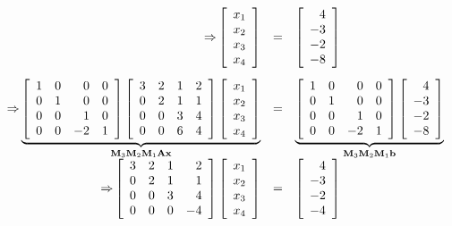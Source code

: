 \[\begin{array}{rcl} {\Rightarrow}
\left[\begin{array}{r}x_1\\x_2\\x_3\\x_4\end{array}\right]
&=&
\left[\begin{array}{r}4\\-3\\-2\\-8\end{array}\right] \;\;\;\\ \vspace*{-1mm} \\
{\Rightarrow} \underbrace{
\left[\begin{array}{rrrr}1&0&0&0\\ 0&1&0&0\\ 0 &0&1&0\\ 0&0&-2&1\end{array}\right]
\left[\begin{array}{rrrr}3&2&1&2\\ 0&2&1&1\\ 0&0&3&4\\0&0&6&4\end{array}\right] 
\left[\begin{array}{r}x_1\\x_2\\x_3\\x_4\end{array}\right]
}_{ {\mathbf{M}_3} {\mathbf{M}_2\mathbf{M}_1\mathbf{A}\mathbf{x}}}
& = &
\underbrace{\left[\begin{array}{rrrr}1&0&0&0\\ 0&1&0&0\\ 0 &0&1&0\\ 0&0&-2&1\end{array}\right]
\left[\begin{array}{r}4\\-3\\-2\\-8\end{array}\right]}_{ {\mathbf{M}_3} {\mathbf{M}_2\mathbf{M}_1\mathbf{b}}}\\
{\Rightarrow} \left[\begin{array}{rrrr}3&2&1&2\\ 0&2&1&1\\ 0&0&3&4\\0&0&0&-4\end{array}\right] 
\left[\begin{array}{r}x_1\\x_2\\x_3\\x_4\end{array}\right]
&=&
\left[\begin{array}{r}4\\-3\\-2\\-4\end{array}\right] 
\end{array}
\]
